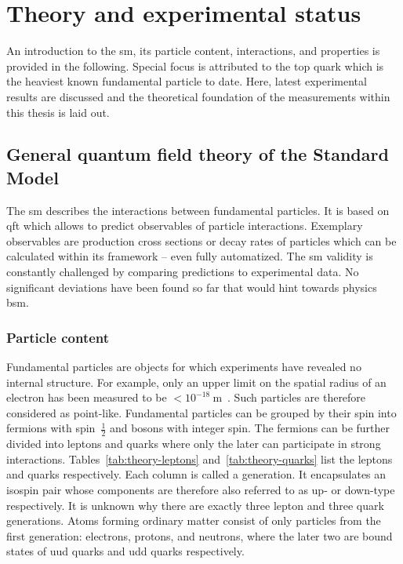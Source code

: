 \chapter{Theory and experimental status}

An introduction to the \gls{sm}, its particle content, interactions, and properties is provided in the following. Special focus is attributed to the top quark which is the heaviest known fundamental particle to date. Here, latest experimental results are discussed and the theoretical foundation of the measurements within this thesis is laid out.


\section{General quantum field theory of the Standard Model}

The \gls{sm} describes the interactions between fundamental particles. It is based on \gls{qft} which allows to predict observables of particle interactions. Exemplary observables are production cross sections or decay rates of particles which can be calculated within its framework -- even fully automatized. The \gls{sm} validity is constantly challenged by comparing predictions to experimental data. No significant deviations have been found so far that would hint towards physics \gls{bsm}.


\subsection{Particle content}

Fundamental particles are objects for which experiments have revealed no internal structure. For example, only an upper limit on the spatial radius of an electron has been measured to be $<10^{-18}~\mathrm{m}$~\cite{PhysRevLett.97.030801}. Such particles are therefore considered as point-like. Fundamental particles can be grouped by their spin into fermions with spin~$\frac{1}{2}$ and bosons with integer spin. The fermions can be further divided into leptons and quarks where only the later can participate in strong interactions. Tables~\ref{tab:theory-leptons} and~\ref{tab:theory-quarks} list the leptons and quarks respectively. Each column is called a generation. It encapsulates an isospin pair whose components are therefore also referred to as up- or down-type respectively. It is unknown why there are exactly three lepton and three quark generations. Atoms forming ordinary matter consist of only particles from the first generation: electrons, protons, and neutrons, where the later two are bound states of uud quarks and udd quarks respectively.

